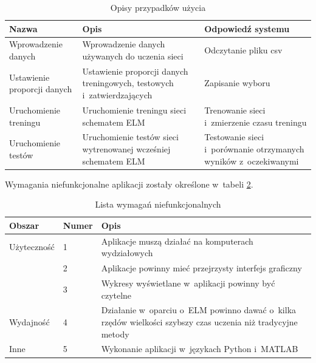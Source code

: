 \documentclass[pl]{minipw} %
\begin{document}
\begin{table}[H]
\caption{Opisy przypadków użycia}
\label{use_case_tab}
\centering
\begin{tabular}{|p{3.4cm}|p{5cm}|p{4cm}|}
\hline
\textbf{Nazwa} & \textbf{Opis} & \textbf{Odpowiedź systemu} \\
\hline
Wprowadzenie danych & Wprowadzenie danych używanych do uczenia sieci & Odczytanie pliku csv \\ \hline
Ustawienie proporcji danych & Ustawienie proporcji danych treningowych, testowych i~zatwierdzających & Zapisanie wyboru \\ \hline
Uruchomienie treningu & Uruchomienie treningu sieci schematem ELM & Trenowanie sieci i~zmierzenie czasu treningu \\ \hline
Uruchomienie testów & Uruchomienie testów sieci wytrenowanej wcześniej schematem ELM & Testowanie sieci i~porównanie otrzymanych wyników z~oczekiwanymi \\
\hline
\end{tabular}
\end{table}

Wymagania niefunkcjonalne aplikacji zostały określone w~tabeli \ref{niefunkcjonalne}.
\begin{table}[H]
\caption{Lista wymagań niefunkcjonalnych}
\label{niefunkcjonalne}
\begin{tabular}{|l|l|p{9.4cm}|}
\hline
\textbf{Obszar} & \textbf{Numer} & \textbf{Opis} \\
\hline
Użyteczność & 1 & Aplikacje muszą działać na komputerach wydziałowych \\
 & 2 & Aplikacje powinny mieć przejrzysty interfejs graficzny \\
 & 3 & Wykresy wyświetlane w~aplikacji powinny być czytelne \\
\hline
Wydajność & 4 & Działanie w~oparciu o~ELM powinno dawać o~kilka rzędów wielkości szybszy czas uczenia niż tradycyjne metody \\
\hline 
Inne & 5 & Wykonanie aplikacji w~językach Python i~MATLAB \\
\hline
\end{tabular}
\end{table}
\end{document}
